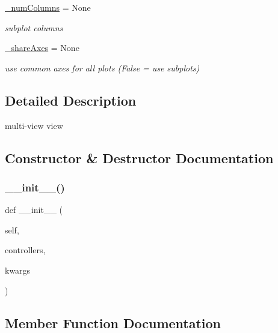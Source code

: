 \begin{DoxyCompactItemize}
\hyperlink{class_mu_mo_t_1_1_mu_mo_tmulti_controller_ac14e35edb2af762045879408234589d5}{\+\_\+num\+Columns} = None
\begin{DoxyCompactList}\small\item\em subplot columns \end{DoxyCompactList}\item 
\hyperlink{class_mu_mo_t_1_1_mu_mo_tmulti_controller_a564f1d8714ede71e8f36f29d64193518}{\+\_\+share\+Axes} = None
\begin{DoxyCompactList}\small\item\em use common axes for all plots (False = use subplots) \end{DoxyCompactList}\end{DoxyCompactItemize}


\subsection{Detailed Description}
multi-\/view view 

\subsection{Constructor \& Destructor Documentation}
\mbox{\label{class_mu_mo_t_1_1_mu_mo_tmulti_controller_a5d04c30f0b85d1b7f2aa0fb1b23dca97}} 
\subsubsection{\texorpdfstring{\+\_\+\+\_\+init\+\_\+\+\_\+()}{\_\_init\_\_()}}
{\footnotesize\ttfamily def \+\_\+\+\_\+init\+\_\+\+\_\+ (\begin{DoxyParamCaption}\item[{}]{self,  }\item[{}]{controllers,  }\item[{}]{kwargs }\end{DoxyParamCaption})}



\subsection{Member Function Documentation}
\mbox{\label{class_mu_mo_t_1_1_mu_mo_tmulti_controller_af16e1740482c0100b1ca9530587004d0}} 
